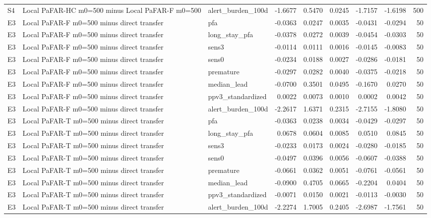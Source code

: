 \begin{table}[tbp]
{\begin{tabular}{lllrrrrrr}
S4 & Local PaFAR-HC m0=500 minus Local PaFAR-F m0=500 & alert\_burden\_100d & -1.6677 & 0.5470 & 0.0245 & -1.7157 & -1.6198 & 500 \\
E3 & Local PaFAR-F m0=500 minus direct transfer & pfa & -0.0363 & 0.0247 & 0.0035 & -0.0431 & -0.0294 & 50 \\
E3 & Local PaFAR-F m0=500 minus direct transfer & long\_stay\_pfa & -0.0378 & 0.0272 & 0.0039 & -0.0454 & -0.0303 & 50 \\
E3 & Local PaFAR-F m0=500 minus direct transfer & sens3 & -0.0114 & 0.0111 & 0.0016 & -0.0145 & -0.0083 & 50 \\
E3 & Local PaFAR-F m0=500 minus direct transfer & sens0 & -0.0234 & 0.0188 & 0.0027 & -0.0286 & -0.0181 & 50 \\
E3 & Local PaFAR-F m0=500 minus direct transfer & premature & -0.0297 & 0.0282 & 0.0040 & -0.0375 & -0.0218 & 50 \\
E3 & Local PaFAR-F m0=500 minus direct transfer & median\_lead & -0.0700 & 0.3501 & 0.0495 & -0.1670 & 0.0270 & 50 \\
E3 & Local PaFAR-F m0=500 minus direct transfer & ppv3\_standardized & 0.0022 & 0.0073 & 0.0010 & 0.0002 & 0.0042 & 50 \\
E3 & Local PaFAR-F m0=500 minus direct transfer & alert\_burden\_100d & -2.2617 & 1.6371 & 0.2315 & -2.7155 & -1.8080 & 50 \\
E3 & Local PaFAR-T m0=500 minus direct transfer & pfa & -0.0363 & 0.0238 & 0.0034 & -0.0429 & -0.0297 & 50 \\
E3 & Local PaFAR-T m0=500 minus direct transfer & long\_stay\_pfa & 0.0678 & 0.0604 & 0.0085 & 0.0510 & 0.0845 & 50 \\
E3 & Local PaFAR-T m0=500 minus direct transfer & sens3 & -0.0233 & 0.0173 & 0.0024 & -0.0280 & -0.0185 & 50 \\
E3 & Local PaFAR-T m0=500 minus direct transfer & sens0 & -0.0497 & 0.0396 & 0.0056 & -0.0607 & -0.0388 & 50 \\
E3 & Local PaFAR-T m0=500 minus direct transfer & premature & -0.0661 & 0.0362 & 0.0051 & -0.0761 & -0.0561 & 50 \\
E3 & Local PaFAR-T m0=500 minus direct transfer & median\_lead & -0.0900 & 0.4705 & 0.0665 & -0.2204 & 0.0404 & 50 \\
E3 & Local PaFAR-T m0=500 minus direct transfer & ppv3\_standardized & -0.0071 & 0.0150 & 0.0021 & -0.0113 & -0.0030 & 50 \\
E3 & Local PaFAR-T m0=500 minus direct transfer & alert\_burden\_100d & -2.2274 & 1.7005 & 0.2405 & -2.6987 & -1.7561 & 50 \\

\end{tabular}}
\end{table}
